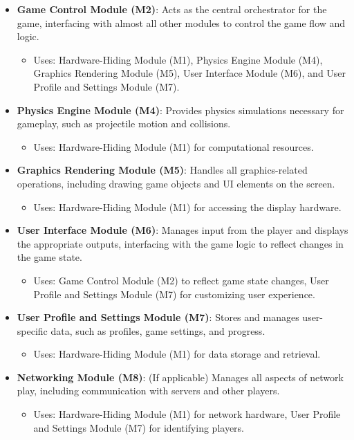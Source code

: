 \documentclass[12pt]{article}
\begin{document}
\begin{itemize}
    \item \textbf{Game Control Module (M2)}: Acts as the central orchestrator for the game, interfacing with almost all other modules to control the game flow and logic.
    \begin{itemize}
        \item Uses: Hardware-Hiding Module (M1), Physics Engine Module (M4), Graphics Rendering Module (M5), User Interface Module (M6), and User Profile and Settings Module (M7).
    \end{itemize}
    \item \textbf{Physics Engine Module (M4)}: Provides physics simulations necessary for gameplay, such as projectile motion and collisions.
    \begin{itemize}
        \item Uses: Hardware-Hiding Module (M1) for computational resources.
    \end{itemize}
    \item \textbf{Graphics Rendering Module (M5)}: Handles all graphics-related operations, including drawing game objects and UI elements on the screen.
    \begin{itemize}
        \item Uses: Hardware-Hiding Module (M1) for accessing the display hardware.
    \end{itemize}
    \item \textbf{User Interface Module (M6)}: Manages input from the player and displays the appropriate outputs, interfacing with the game logic to reflect changes in the game state.
    \begin{itemize}
        \item Uses: Game Control Module (M2) to reflect game state changes, User Profile and Settings Module (M7) for customizing user experience.
    \end{itemize}
    \item \textbf{User Profile and Settings Module (M7)}: Stores and manages user-specific data, such as profiles, game settings, and progress.
    \begin{itemize}
        \item Uses: Hardware-Hiding Module (M1) for data storage and retrieval.
    \end{itemize}
    \item \textbf{Networking Module (M8)}: (If applicable) Manages all aspects of network play, including communication with servers and other players.
    \begin{itemize}
        \item Uses: Hardware-Hiding Module (M1) for network hardware, User Profile and Settings Module (M7) for identifying players.
    \end{itemize}
\end{itemize}
\end{document}
